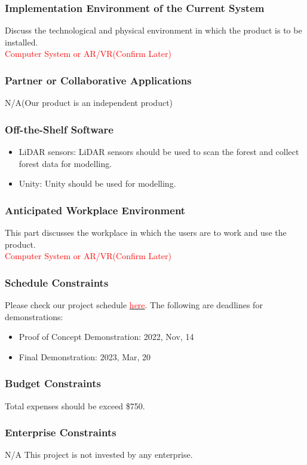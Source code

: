 \documentclass{article}
\begin{document}
\subsubsection{Implementation Environment of the Current System}
Discuss the technological and physical environment in which the product is to be installed.\\
\textcolor{red}{Computer System or AR/VR(Confirm Later)}
\subsubsection{Partner or Collaborative Applications}
N/A(Our product is an independent product)
\subsubsection{Off-the-Shelf Software}
\begin{itemize}
    \item LiDAR sensors: LiDAR sensors should be used to scan the forest and collect forest data
    for modelling.
    \item Unity: Unity should be used for modelling.
\end{itemize}
\subsubsection{Anticipated Workplace Environment}
This part discusses the workplace in which the users are to work and use the product.\\
\textcolor{red}{Computer System or AR/VR(Confirm Later)}
\subsubsection{Schedule Constraints}
Please check our project schedule \href{https://github.com/wuj187/DigitalTwinCAS/tree/main/docs/DevelopmentPlan/Project_Schedule}{\textcolor{red}{here}}. The following are deadlines for demonstrations:
\begin{itemize}
    \item Proof of Concept Demonstration: 2022, Nov, 14
    \item Final Demonstration: 2023, Mar, 20
\end{itemize}
\subsubsection{Budget Constraints}
Total expenses should be exceed \$750.
\subsubsection{Enterprise Constraints}
N/A This project is not invested by any enterprise.
\end{document}
